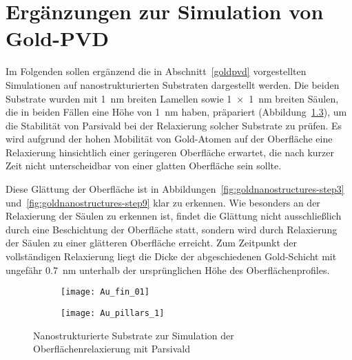 \chapter{Ergänzungen zur Simulation von Gold-PVD}

Im Folgenden sollen ergänzend die in Abschnitt~\ref{goldpvd} vorgestellten Simulationen auf nanostrukturierten Substraten dargestellt werden.
Die beiden Substrate wurden mit \SI{1}{\nano\meter} breiten Lamellen sowie \SI{1x1}{\nano\meter} breiten Säulen, die in beiden Fällen eine Höhe von \SI{1}{\nano\meter} haben, präpariert (Abbildung~\ref{fig:goldnanostructures}), um die Stabilität von Parsivald bei der Relaxierung solcher Substrate zu prüfen.
Es wird aufgrund der hohen Mobilität von Gold-Atomen auf der Oberfläche eine Relaxierung hinsichtlich einer geringeren Oberfläche erwartet, die nach kurzer Zeit nicht unterscheidbar von einer glatten Oberfläche sein sollte.

Diese Glättung der Oberfläche ist in Abbildungen~\ref{fig:goldnanostructures-step3} und~\ref{fig:goldnanostructures-step9} klar zu erkennen.
Wie besonders an der Relaxierung der Säulen zu erkennen ist, findet die Glättung nicht ausschließlich durch eine Beschichtung der Oberfläche statt, sondern wird durch Relaxierung der Säulen zu einer glätteren Oberfläche erreicht.
Zum Zeitpunkt der vollständigen Relaxierung liegt die Dicke der abgeschiedenen Gold-Schicht mit ungefähr \SI{0.7}{\nano\meter} unterhalb der ursprünglichen Höhe des Oberflächenprofiles.

\vspace{3em}

\begin{figure}[bh]
  \captionsetup[subfigure]{singlelinecheck=false}
  \def\subfigwidth{0.49\textwidth}

  \begin{subfigure}[t]{\subfigwidth}
    \texttt{[image: Au\_fin\_01]}
    \label{fig:goldnanostructures-fins}
  \end{subfigure}
  \hfill
  \begin{subfigure}[t]{\subfigwidth}
    \texttt{[image: Au\_pillars\_1]}
    \label{fig:goldnanostructures-columns}
  \end{subfigure}

  \caption{Nanostrukturierte Substrate zur Simulation der Oberflächenrelaxierung mit Parsivald}
  \label{fig:goldnanostructures}

\end{figure}

